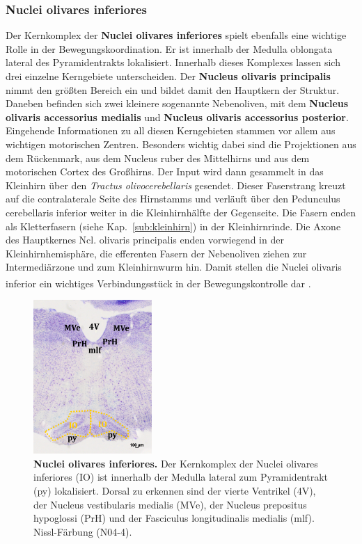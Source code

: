 \documentclass[12pt,a4paper,pdftex]{article}
\begin{document}
\subsubsection{Nuclei olivares inferiores}   \label{subsubsec:untere_olive}
Der Kernkomplex der \textbf{Nuclei olivares inferiores} spielt ebenfalls eine wichtige Rolle in der Bewegungskoordination. Er ist innerhalb der Medulla oblongata lateral des Pyramidentrakts lokalisiert. Innerhalb dieses Komplexes lassen sich drei einzelne Kerngebiete unterscheiden. Der \textbf{Nucleus olivaris principalis} nimmt den größten Bereich ein und bildet damit den Hauptkern der Struktur. Daneben befinden sich zwei kleinere sogenannte Nebenoliven, mit dem \textbf{Nucleus olivaris accessorius medialis} und \textbf{Nucleus olivaris accessorius posterior}. Eingehende Informationen zu all diesen Kerngebieten stammen vor allem aus wichtigen motorischen Zentren. Besonders wichtig dabei sind die Projektionen aus dem Rückenmark, aus dem Nucleus ruber des Mittelhirns und aus dem motorischen Cortex des Großhirns. Der Input wird dann gesammelt in das Kleinhirn über den \textit{Tractus olivocerebellaris} gesendet. Dieser Faserstrang kreuzt auf die contralaterale Seite des Hirnstamms und verläuft über den Pedunculus cerebellaris inferior weiter in die Kleinhirnhälfte der Gegenseite. Die Fasern enden als Kletterfasern (siehe Kap.~\ref{sub:kleinhirn}) in der Kleinhirnrinde. Die Axone des Hauptkernes Ncl. olivaris principalis enden vorwiegend in der Kleinhirnhemisphäre, die efferenten Fasern der Nebenoliven ziehen zur Intermediärzone und zum Kleinhirnwurm hin. Damit stellen die Nuclei olivaris inferior ein wichtiges Verbindungsstück in der Bewegungskontrolle dar \textsuperscript{\cite[5]{trepel2011neuroanatomie}}.  

\begin{figure}[H]
    \centering
    \includegraphics[width=0.4\textwidth]{pictures/Bilder_Laura/untere_olive_N04_4.png}
    \caption[Nuclei olivares inferiores]{\textbf{Nuclei olivares inferiores.} Der Kernkomplex der Nuclei olivares inferiores (IO) ist innerhalb der Medulla lateral zum Pyramidentrakt (py) lokalisiert. Dorsal zu erkennen sind der vierte Ventrikel (4V), der Nucleus vestibularis medialis (MVe), der Nucleus prepositus hypoglossi (PrH) und der Fasciculus longitudinalis medialis (mlf). Nissl-Färbung (N04-4).}
    \label{fig:untere_olive}
\end{figure}
\end{document}
